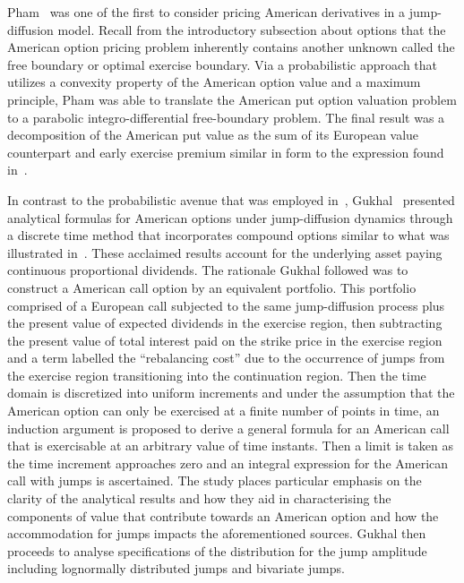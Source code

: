 Pham~\cite{Pham1997} was one of the first to consider pricing American derivatives in a jump-diffusion model. Recall from the introductory subsection about options that the American option pricing problem inherently contains another unknown called the free boundary or optimal exercise boundary. Via a probabilistic approach that utilizes a convexity property of the American option value and a maximum principle, Pham was able to translate the American put option valuation problem to a parabolic integro-differential free-boundary problem. The final result was a decomposition of the American put value as the sum of its European value counterpart and early exercise premium similar in form to the expression found in~\cite{Kim1990}.

In contrast to the probabilistic avenue that was employed in~\cite{Pham1997}, Gukhal~\cite{Gukhal2001} presented analytical formulas for American options under jump-diffusion dynamics through a discrete time method that incorporates compound options similar to what was illustrated in~\cite{Geske1979}. These acclaimed results account for the underlying asset paying continuous proportional dividends. The rationale Gukhal followed was to construct a American call option by an equivalent portfolio. This portfolio comprised of a European call subjected to the same jump-diffusion process plus the present value of expected dividends in the exercise region, then subtracting the present value of total interest paid on the strike price in the exercise region and a term labelled the ``rebalancing cost'' due to the occurrence of jumps from the exercise region transitioning into the continuation region. Then the time domain is discretized into uniform increments and under the assumption that the American option can only be exercised at a finite number of points in time, an induction argument is proposed to derive a general formula for an American call that is exercisable at an arbitrary value of time instants. Then a limit is taken as the time increment approaches zero and an integral expression for the American call with jumps is ascertained. The study places particular emphasis on the clarity of the analytical results and how they aid in characterising the components of value that contribute towards an American option and how the accommodation for jumps impacts the aforementioned sources. Gukhal then proceeds to analyse specifications of the distribution for the jump amplitude including lognormally distributed jumps and bivariate jumps. 

